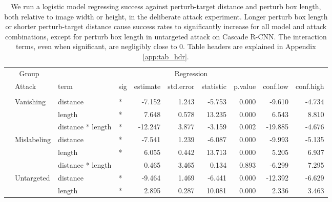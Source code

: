 \begingroup\fontsize{9}{11}\selectfont

\begin{longtable}[t]{llllrrrrrr}
\caption{\label{tab:arbitrary_trend_table}We run a logistic model regressing success against perturb-target distance and perturb box length, both relative to image width or height, in the deliberate attack experiment. Longer perturb box length or shorter perturb-target distance cause success rates to significantly increase for all model and attack combinations, except for perturb box length in untargeted attack on Cascade R-CNN. The interaction terms, even when significant, are negligibly close to 0. Table headers are explained in Appendix \ref{app:tab_hdr}.}\\
\toprule
\multicolumn{2}{c}{Group} & \multicolumn{8}{c}{Regression} \\
\cmidrule(l{3pt}r{3pt}){1-2} \cmidrule(l{3pt}r{3pt}){3-10}
 & Attack & term & sig & estimate & std.error & statistic & p.value & conf.low & conf.high\\
\midrule
\addlinespace[0.3em]
\multicolumn{10}{l}{\textbf{YOLOv3}}\\
\hspace{1em} & Vanishing & distance & * & -7.152 & 1.243 & -5.753 & 0.000 & -9.610 & -4.734\\
\cmidrule{3-10}\nopagebreak
\hspace{1em} &  & length & * & 7.648 & 0.578 & 13.235 & 0.000 & 6.543 & 8.810\\
\cmidrule{3-10}\nopagebreak
\hspace{1em} &  & distance * length & * & -12.247 & 3.877 & -3.159 & 0.002 & -19.885 & -4.676\\
\cmidrule{2-10}\nopagebreak
\hspace{1em} & Mislabeling & distance & * & -7.541 & 1.239 & -6.087 & 0.000 & -9.993 & -5.135\\
\cmidrule{3-10}\nopagebreak
\hspace{1em} &  & length & * & 6.055 & 0.442 & 13.713 & 0.000 & 5.205 & 6.937\\
\cmidrule{3-10}\nopagebreak
\hspace{1em} &  & distance * length &  & 0.465 & 3.465 & 0.134 & 0.893 & -6.299 & 7.295\\
\cmidrule{2-10}\nopagebreak
\hspace{1em} & Untargeted & distance & * & -9.464 & 1.469 & -6.441 & 0.000 & -12.392 & -6.629\\
\cmidrule{3-10}\nopagebreak
\hspace{1em} &  & length & * & 2.895 & 0.287 & 10.081 & 0.000 & 2.336 & 3.463\\

\end{longtable}
